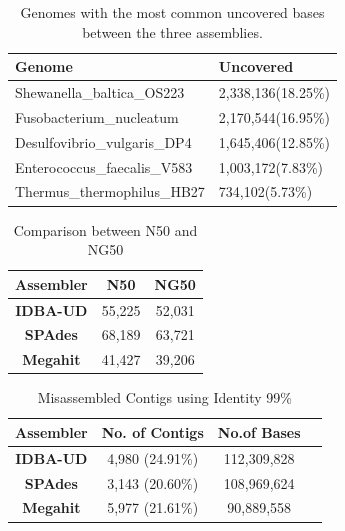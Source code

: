 \documentclass[10pt,a4paper,twocolumn]{article}
\begin{document}
\begin{table}[!h]
 \centering
 \caption{Genomes with the most common uncovered bases between the three assemblies.}
 \begin{tabular}{|p{4.50cm}|p{2.75cm}|} \hline
 \textbf{Genome} & \textbf{Uncovered} \\ \hline 
Shewanella\_baltica\_OS223&2,338,136(18.25\%)\\ \hline
Fusobacterium\_nucleatum&2,170,544(16.95\%)\\ \hline
Desulfovibrio\_vulgaris\_DP4&1,645,406(12.85\%)\\ \hline
Enterococcus\_faecalis\_V583&1,003,172(7.83\%)\\ \hline
Thermus\_thermophilus\_HB27&734,102(5.73\%)\\ \hline
\end{tabular}
\label{table:genomes_uncovered}
\end{table}

\begin{table}[!ht]
\caption{Comparison between N50 and NG50}
\centering
\begin{tabular}{|c|c|c|}
\hline

\textbf{Assembler}& \textbf{N50} &  \textbf{NG50}    \\ [0.5ex] %
\hline
\textbf{IDBA-UD}&55,225 &52,031\\
\hline
\textbf{SPAdes}&68,189&63,721 \\
\hline
\textbf{Megahit}&41,427&39,206 \\
\hline
\end{tabular}
\label{table:n50-ng50} 
\end{table}


\begin{table}[t]
\caption{Misassembled Contigs using Identity 99\%}
\centering
\begin{tabular}{|c|c|c|c|}
\hline

\textbf{Assembler}& \textbf{No. of Contigs} &\textbf{No.of Bases} \\ [0.5ex] %
\hline
\textbf{IDBA-UD}& 4,980 (24.91\%) &112,309,828\\
\hline
\textbf{SPAdes} & 3,143 (20.60\%) &108,969,624 \\
\hline
\textbf{Megahit}& 5,977 (21.61\%) &90,889,558  \\
\hline
\end{tabular}
\label{table:misassembled} 
\end{table}
\end{document}
